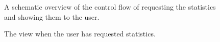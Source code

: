 
	\begin{figure}
		\caption{A schematic overview of the control flow of requesting the statistics and showing them to the user.}
		\label{fig:1:controlflowStat}
	\end{figure}

	\begin{figure}
		\caption{The view when the user has requested statistics.}
		\label{fig:1:viewStat}
	\end{figure}